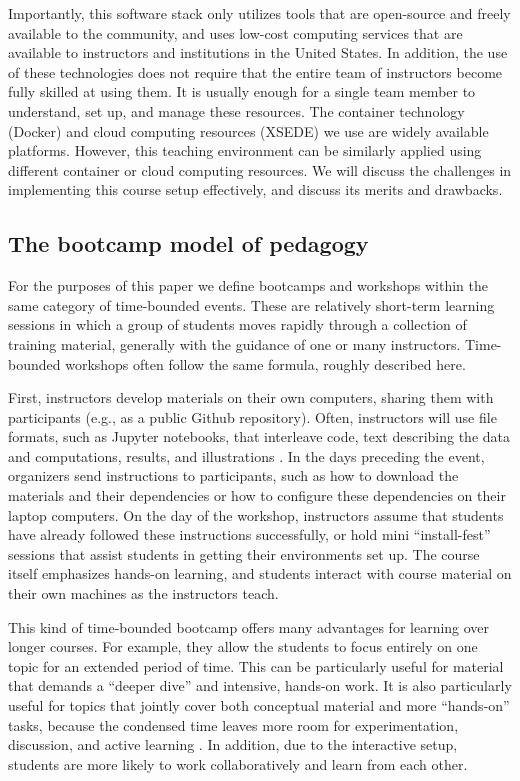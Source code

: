 Importantly, this software stack only utilizes tools that are
open-source and freely available to
the community, and uses low-cost computing services that are available
to instructors and institutions in the United States. In addition, the
use of these technologies does not require that the entire
team of instructors become fully skilled at using them. It is
usually enough for a single team member to understand, set up, and manage these resources.
The container technology (Docker) and cloud
computing resources (XSEDE) we use are widely available platforms.
However, this teaching environment can be similarly applied using
different container or cloud computing resources.
We will discuss the challenges in implementing this course
setup effectively, and discuss its merits and drawbacks.

\subsection{The bootcamp model of pedagogy}

For the purposes of this paper we define bootcamps and workshops within
the same category of time-bounded events. These are relatively short-term
learning sessions in which a group of students moves rapidly through a
collection of training material, generally with the guidance of one
or many instructors. Time-bounded workshops often follow the same
formula, roughly described here.

First, instructors develop materials on their own computers, sharing them with
participants (e.g., as a public Github repository). Often, instructors will use
file formats, such as Jupyter notebooks, that
interleave code, text describing the
data and computations, results, and illustrations
\cite{kluyver2016jupyter}. In the days preceding the event, organizers send
instructions to participants, such as how to download the materials and their
dependencies or how to configure these dependencies on their
laptop computers. On the day of the workshop, instructors assume that
students have already followed these instructions successfully, or hold
mini ``install-fest'' sessions that assist students in
getting their environments set up. The course itself emphasizes hands-on
learning, and students interact with course material on their own
machines as the instructors teach.

This kind of time-bounded bootcamp offers many advantages for learning over
longer courses. For example, they allow the students to focus
entirely on one topic for an extended period of time. This can be particularly
useful for material that demands a ``deeper dive'' and intensive, hands-on
work. It is also particularly useful for topics that jointly
cover both conceptual material and more ``hands-on'' tasks, because the
condensed time leaves more room for experimentation, discussion, and active
learning \citep{Bransford2000-lu, Papert1980-fh}. In addition, due to the
interactive setup, students are more likely to work collaboratively and learn
from each other.

